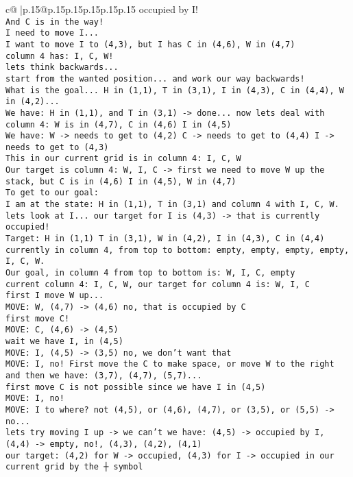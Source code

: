 \documentclass{article}
\begin{document}
{\begin{supertabular}{c@{$\;$}|p{.15\linewidth}@{}p{.15\linewidth}p{.15\linewidth}p{.15\linewidth}p{.15\linewidth}p{.15\linewidth}}
{{{occupied by I!\\ \tt  And C is in the way!\\ \tt  I need to move I...\\ \tt  I want to move I to (4,3), but I has C in (4,6), W in (4,7)\\ \tt  column 4 has: I, C, W!\\ \tt  lets think backwards...\\ \tt  start from the wanted position... and work our way backwards!\\ \tt  What is the goal... H in (1,1), T in (3,1), I in (4,3), C in (4,4), W in (4,2)... \\ \tt  We have: H in (1,1), and T in (3,1) -> done... now lets deal with column 4: W is in (4,7), C in (4,6) I in (4,5)\\ \tt  We have: W -> needs to get to (4,2) C -> needs to get to (4,4) I -> needs to get to (4,3)\\ \tt  This in our current grid is in column 4: I, C, W\\ \tt  Our target is column 4: W, I, C -> first we need to move W up the stack, but C is in (4,6) I in (4,5), W in (4,7)\\ \tt  To get to our goal: \\ \tt  I am at the state: H in (1,1), T in (3,1) and column 4 with I, C, W.\\ \tt  lets look at I... our target for I is (4,3) -> that is currently occupied!\\ \tt  Target: H in (1,1) T in (3,1), W in (4,2), I in (4,3), C in (4,4) \\ \tt  currently in column 4, from top to bottom: empty, empty, empty, empty, I, C, W.\\ \tt  Our goal, in column 4 from top to bottom is: W, I, C, empty\\ \tt  current column 4: I, C, W, our target for column 4 is: W, I, C\\ \tt  first I move W up...\\ \tt  MOVE: W, (4,7) -> (4,6) no, that is occupied by C\\ \tt  first move C!\\ \tt  MOVE: C, (4,6) -> (4,5) \\ \tt  wait we have I, in (4,5)\\ \tt  MOVE: I, (4,5) -> (3,5) no, we don't want that\\ \tt  MOVE: I, no! First move the C to make space, or move W to the right and then we have: (3,7), (4,7), (5,7)...\\ \tt  first move C is not possible since we have I in (4,5) \\ \tt  MOVE: I, no! \\ \tt  MOVE: I to where? not (4,5), or (4,6), (4,7), or (3,5), or (5,5) -> no...\\ \tt  lets try moving I up -> we can't we have: (4,5) -> occupied by I, (4,4) -> empty, no!, (4,3), (4,2), (4,1) \\ \tt  our target: (4,2) for W -> occupied, (4,3) for I -> occupied in our current grid by the ┼ symbol\\ }}}
\end{supertabular}}
\end{document}
